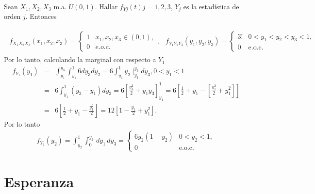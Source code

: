 \begin{Ejem}
Sean $X_{1},X_{2},X_{3}$ m.a. $U\left(0,1\right)$. Hallar $f_{Yj}\left( t \right) j=1,2,3$, $Y_{j}$ es la estad\'istica de orden $j$. Entonces 

\begin{eqnarray*}
\begin{array}{ll}
f_{X_{1}X_{2}X_{3}}\left(x_{1},x_{2},x_{3} \right) = \begin{cases}
1 & x_{1},x_{2},x_{3} \in \left(0,1\right),\\  
0 & e.o.c.
\end{cases} ,& 
f_{Y_{1}Y_{2}Y_{3}}\left(y_{1},y_{2},y_{3} \right) = \begin{cases}
3! & 0<y_{1}<y_{2}<y_{3}<1,\\  
0 & \textrm {e.o.c.}
\end{cases}  
\end{array}
\end{eqnarray*}
Por lo tanto, calculando la marginal con respecto a $Y_{1}$
\begin{eqnarray*}
f_{Y_{1}}\left( y_{1}\right)&=&\int_{y_{1}}^{y_{3}}\int_{y_{1}}^{1}6dy_{3}dy_{2} = 6\int_{y_{1}}^{1} y_{2}\mid _{y_{1}}^{y_{3}}dy_{3}, 0<y_{1}<1\\
&=& 6\int_{y_{1}}^{1}\left( y_{3}-y_{1} \right)dy_{3}= 6 \left[\frac{y_{3}^{2}}{2}+y_{1}y_{3}\right]_{y_{1}}^{1}=6\left[\frac{1}{2}+y_{1}-\left[\frac{y_{1}^{2}}{2}+ y_{1}^{2}\right]\right]\\
&=& 6\left[\frac{1}{2}+y_{1}-\frac{y_{1}^{2}}{2} \right]=12\left[1-\frac{y_{1}}{2}+y_{1}^{2}\right].
\end{eqnarray*}
Por lo tanto
\begin{eqnarray*}
f_{Y_{2}}\left(y_{2}\right)=\int _{y_{2}}^{1} \int_{0}^{y_{2}} \,dy_{1}\,dy_{3}= \begin{cases}
6y_{2}\left(1-y_{2}\right) & 0<y_{2}<1,\\  
0 & \textrm{e.o.c.}
\end{cases}
\end{eqnarray*}
\end{Ejem}

\section{Esperanza}


